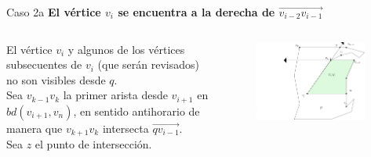 \documentclass[aspectratio=169,xcolor=dvipsnames, t]{beamer}
\begin{document}
\begin{frame}{Caso 2a}
    \textbf{El vértice $v_{i}$ se encuentra a la derecha de $\overrightarrow{v_{i-2}v_{i-1}}$}\\
    \vspace{0.5cm}
    \begin{columns}
    \begin{column}{0.45\textwidth}
    El vértice $v_{i}$ y algunos de los vértices subsecuentes de $v_{i}$ (que serán revisados) no son visibles desde $q$.\\
    \vspace{0.5cm}
    Sea $v_{k-1}v_{k}$ la primer arista desde $v_{i+1}$ en $bd(v_{i+1},v_{n})$, en sentido antihorario de manera que $v_{k+1}v_{k}$ intersecta $\overrightarrow{qv_{i-1}}$.\\
    \vspace{0.5cm}
    Sea $z$ el punto de intersección.
    \end{column}
    \begin{column}{0.45\textwidth}  %
    \vspace{-1.5cm} %
        \begin{figure}
            \centering
            \includegraphics[width=0.95\textwidth]{imagenes/Caso2.4b.png}
        \end{figure}
    \end{column}
    \end{columns}
\end{frame}

\end{document}
